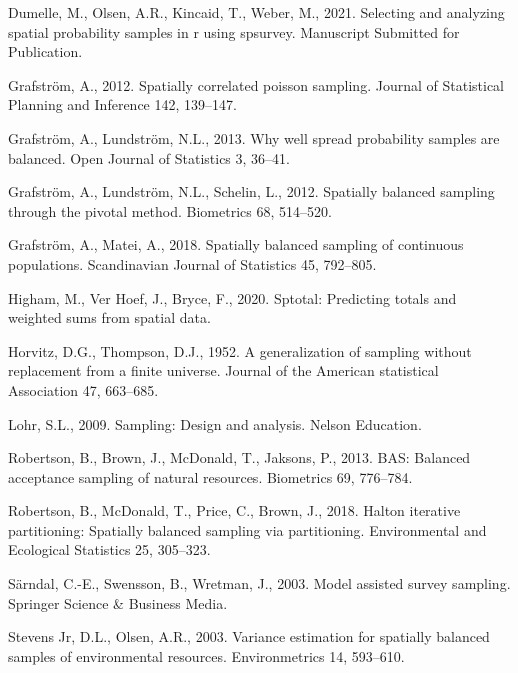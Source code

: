 \documentclass[]{elsarticle} %
\begin{document}
\leavevmode\hypertarget{ref-dumelle2021spsurvey}{}%
Dumelle, M., Olsen, A.R., Kincaid, T., Weber, M., 2021. Selecting and
analyzing spatial probability samples in r using spsurvey. Manuscript
Submitted for Publication.

\leavevmode\hypertarget{ref-grafstrom2012spatiallypoisson}{}%
Grafström, A., 2012. Spatially correlated poisson sampling. Journal of
Statistical Planning and Inference 142, 139--147.

\leavevmode\hypertarget{ref-grafstrom2013well}{}%
Grafström, A., Lundström, N.L., 2013. Why well spread probability
samples are balanced. Open Journal of Statistics 3, 36--41.

\leavevmode\hypertarget{ref-grafstrom2012spatially}{}%
Grafström, A., Lundström, N.L., Schelin, L., 2012. Spatially balanced
sampling through the pivotal method. Biometrics 68, 514--520.

\leavevmode\hypertarget{ref-grafstrom2018spatially}{}%
Grafström, A., Matei, A., 2018. Spatially balanced sampling of
continuous populations. Scandinavian Journal of Statistics 45, 792--805.

\leavevmode\hypertarget{ref-higham2020sptotal}{}%
Higham, M., Ver Hoef, J., Bryce, F., 2020. Sptotal: Predicting totals
and weighted sums from spatial data.

\leavevmode\hypertarget{ref-horvitz1952generalization}{}%
Horvitz, D.G., Thompson, D.J., 1952. A generalization of sampling
without replacement from a finite universe. Journal of the American
statistical Association 47, 663--685.

\leavevmode\hypertarget{ref-lohr2009sampling}{}%
Lohr, S.L., 2009. Sampling: Design and analysis. Nelson Education.

\leavevmode\hypertarget{ref-robertson2013bas}{}%
Robertson, B., Brown, J., McDonald, T., Jaksons, P., 2013. BAS: Balanced
acceptance sampling of natural resources. Biometrics 69, 776--784.

\leavevmode\hypertarget{ref-robertson2018halton}{}%
Robertson, B., McDonald, T., Price, C., Brown, J., 2018. Halton
iterative partitioning: Spatially balanced sampling via partitioning.
Environmental and Ecological Statistics 25, 305--323.

\leavevmode\hypertarget{ref-sarndal2003model}{}%
Särndal, C.-E., Swensson, B., Wretman, J., 2003. Model assisted survey
sampling. Springer Science \& Business Media.

\leavevmode\hypertarget{ref-stevens2003variance}{}%
Stevens Jr, D.L., Olsen, A.R., 2003. Variance estimation for spatially
balanced samples of environmental resources. Environmetrics 14,
593--610.
\end{document}
